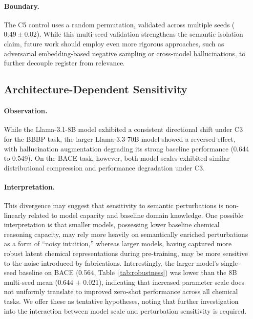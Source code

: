 \paragraph{Boundary.} The C5 control uses a random permutation, validated across multiple seeds ($0.49 \pm 0.02$). While this multi-seed validation strengthens the semantic isolation claim, future work should employ even more rigorous approaches, such as adversarial embedding-based negative sampling or cross-model hallucinations, to further decouple register from relevance.

\subsection{Architecture-Dependent Sensitivity}
\paragraph{Observation.} While the Llama-3.1-8B model exhibited a consistent directional shift under C3 for the BBBP task, the larger Llama-3.3-70B model showed a reversed effect, with hallucination augmentation degrading its strong baseline performance (0.644 to 0.549). On the BACE task, however, both model scales exhibited similar distributional compression and performance degradation under C3.

\paragraph{Interpretation.} This divergence may suggest that sensitivity to semantic perturbations is non-linearly related to model capacity and baseline domain knowledge. One possible interpretation is that smaller models, possessing lower baseline chemical reasoning capacity, may rely more heavily on semantically enriched perturbations as a form of ``noisy intuition,'' whereas larger models, having captured more robust latent chemical representations during pre-training, may be more sensitive to the noise introduced by fabrications. Interestingly, the larger model's single-seed baseline on BACE (0.564, Table~\ref{tab:robustness}) was lower than the 8B multi-seed mean (0.644 $\pm$ 0.021), indicating that increased parameter scale does not uniformly translate to improved zero-shot performance across all chemical tasks. We offer these as tentative hypotheses, noting that further investigation into the interaction between model scale and perturbation sensitivity is required.

